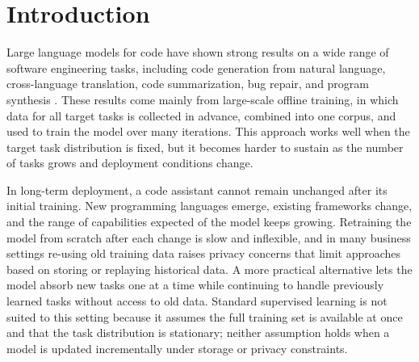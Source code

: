 \section{Introduction}
\label{sec:introduction}

Large language models for code have shown strong results on a wide range of software engineering tasks, including code generation from natural language, cross-language translation, code summarization, bug repair, and program synthesis \citep{wang2021codet5,roziere2023codellama,hui2024qwen25coder,lozhkov2024starcoder2,lu2021codexglue,chen2021evaluating,austin2021program}. These results come mainly from large-scale offline training, in which data for all target tasks is collected in advance, combined into one corpus, and used to train the model over many iterations. This approach works well when the target task distribution is fixed, but it becomes harder to sustain as the number of tasks grows and deployment conditions change.

In long-term deployment, a code assistant cannot remain unchanged after its initial training. New programming languages emerge, existing frameworks change, and the range of capabilities expected of the model keeps growing. Retraining the model from scratch after each change is slow and inflexible, and in many business settings re-using old training data raises privacy concerns that limit approaches based on storing or replaying historical data. A more practical alternative lets the model absorb new tasks one at a time while continuing to handle previously learned tasks without access to old data. Standard supervised learning is not suited to this setting because it assumes the full training set is available at once and that the task distribution is stationary; neither assumption holds when a model is updated incrementally under storage or privacy constraints.

